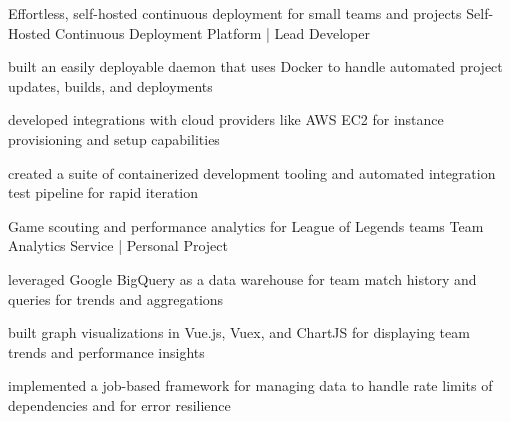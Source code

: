 \begin{cventries}

  \cventry
    {Effortless, self-hosted continuous deployment for small teams and projects} %
    {Self-Hosted Continuous Deployment Platform | Lead Developer} %
    {} %
    {} %
    {
      \begin{cvitems} %
        \item {built an easily deployable daemon that uses Docker to handle automated project updates, builds, and deployments}
        \item {developed integrations with cloud providers like AWS EC2 for instance provisioning and setup capabilities}
        \item{created a suite of containerized development tooling and automated integration test pipeline for rapid iteration}
      \end{cvitems}
    }

  \cventry
    {Game scouting and performance analytics for League of Legends teams} %
    {Team Analytics Service | Personal Project} %
    {} %
    {} %
    {
      \begin{cvitems} %
        \item {leveraged Google BigQuery as a data warehouse for team match history and queries for trends and aggregations}
        \item {built graph visualizations in Vue.js, Vuex, and ChartJS for displaying team trends and performance insights}
        \item {implemented a job-based framework for managing data to handle rate limits of dependencies and for error resilience}
      \end{cvitems}
    }


\end{cventries}
